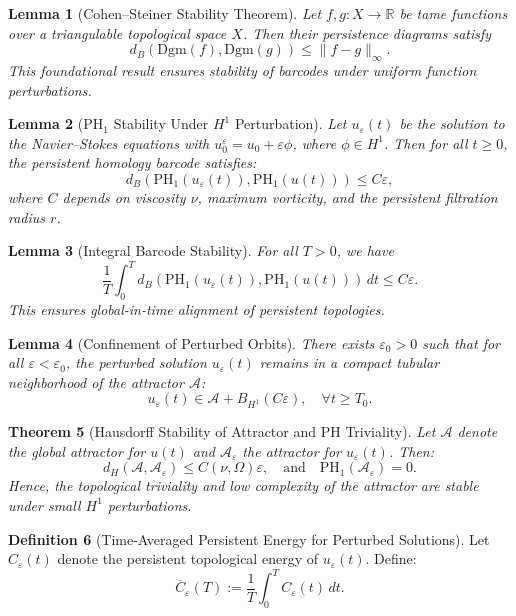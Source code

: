 \documentclass[11pt]{article}
\newtheorem{theorem}{Theorem}[section]
\newtheorem{lemma}[theorem]{Lemma}
\theoremstyle{definition}
\newtheorem{definition}[theorem]{Definition}
\begin{document}
\begin{lemma}[Cohen--Steiner Stability Theorem]
Let $f, g : X \to \mathbb{R}$ be tame functions over a triangulable topological space $X$. Then their persistence diagrams satisfy
\[
d_B(\mathrm{Dgm}(f), \mathrm{Dgm}(g)) \le \|f - g\|_\infty.
\]
This foundational result ensures stability of barcodes under uniform function perturbations.
\end{lemma}

\begin{lemma}[PH$_1$ Stability Under $H^1$ Perturbation]
Let $u_\varepsilon(t)$ be the solution to the Navier--Stokes equations with $u_0^\varepsilon = u_0 + \varepsilon \phi$, where $\phi \in H^1$. Then for all $t \ge 0$, the persistent homology barcode satisfies:
\[
d_B(\mathrm{PH}_1(u_\varepsilon(t)), \mathrm{PH}_1(u(t))) \le C \varepsilon,
\]
where $C$ depends on viscosity $\nu$, maximum vorticity, and the persistent filtration radius $r$.
\end{lemma}

\begin{lemma}[Integral Barcode Stability]
For all $T > 0$, we have
\[
\frac{1}{T} \int_0^T d_B(\mathrm{PH}_1(u_\varepsilon(t)), \mathrm{PH}_1(u(t))) \, dt \le C \varepsilon.
\]
This ensures global-in-time alignment of persistent topologies.
\end{lemma}

\begin{lemma}[Confinement of Perturbed Orbits]
There exists $\varepsilon_0 > 0$ such that for all $\varepsilon < \varepsilon_0$, the perturbed solution $u_\varepsilon(t)$ remains in a compact tubular neighborhood of the attractor $\mathcal{A}$:
\[
u_\varepsilon(t) \in \mathcal{A} + B_{H^1}(C\varepsilon), \quad \forall t \ge T_0.
\]
\end{lemma}

\begin{theorem}[Hausdorff Stability of Attractor and PH Triviality]
\label{thm:attractor_stability}
Let $\mathcal{A}$ denote the global attractor for $u(t)$ and $\mathcal{A}_\varepsilon$ the attractor for $u_\varepsilon(t)$. Then:
\[
d_H(\mathcal{A}, \mathcal{A}_\varepsilon) \le C(\nu, \Omega)\varepsilon, \quad \text{and} \quad \mathrm{PH}_1(\mathcal{A}_\varepsilon) = 0.
\]
Hence, the topological triviality and low complexity of the attractor are stable under small $H^1$ perturbations.
\end{theorem}

\begin{definition}[Time-Averaged Persistent Energy for Perturbed Solutions]
Let $C_\varepsilon(t)$ denote the persistent topological energy of $u_\varepsilon(t)$. Define:
\[
\overline{C}_\varepsilon(T) := \frac{1}{T} \int_0^T C_\varepsilon(t)\, dt.
\]
\end{definition}
\end{document}
